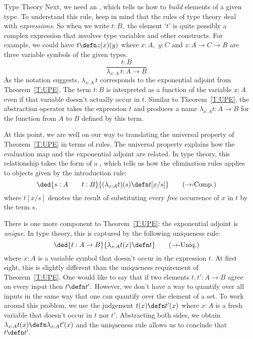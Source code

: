 \begin{unit}{Type Theory}
Next, we need an , which tells us how to \emph{build} elements of a given type.
To understand this rule, keep in mind that the rules of type theory deal with \emph{expressions}.
So when we write \(t:B,\) the element `\(t\)' is quite possibly a complex expression that involves type variables and other constructs.
For example, we could have \(t \defn z(x)(y)\) where \(x:A,\) \(y:C\) and \(z:A \to C \to B\) are three variable symbols of the given types.
\[\frac{t : B}{\lambda_{x:A}\,t : A \to B} \tag{$\to$-Intro.}\]
As the notation suggests, \(\lambda_{x:A}\,t\) corresponds to the exponential adjoint from Theorem~\ref{T:UPE}.
The term \(t:B\) is interpreted as a function of the variable \(x:A\) even if that variable doesn't actually occur in \(t.\)
Similar to Theorem~\ref{T:UPE}, the abstraction operator takes the expression \(t\) and produces a name \(\lambda_{x:A}t : A \to B\) for the function from \(A\) to \(B\) defined by this term.

At this point, we are well on our way to translating the universal property of Theorem~\ref{T:UPE} in terms of rules.
The universal property explains how the evaluation map and the exponential adjoint are related.
In type theory, this relationship takes the form of a , which tells us how the elimination rules applies to objects given by the introduction rule:
\[\ded{s: A \qquad t : B}{(\lambda_{x:A} t)(s) \defn t[x/s]} \tag{$\to$-Comp.}\]
where \(t[x/s]\) denotes the result of substituting every \emph{free} occurrence of \(x\) in \(t\) by the term \(s.\)

There is one more component to Theorem~\ref{T:UPE}: the exponential adjoint is \emph{unique}.
In type theory, this is captured by the following uniqueness rule:
\[\ded{t : A \to B}{\lambda_{x:A} t(x) \defn t} \tag{$\to$-Uniq.}\]
where \(x:A\) is a variable symbol that doesn't occur in the expression \(t.\)
At first sight, this is slightly different than the uniqueness requirement of Theorem~\ref{T:UPE}.
One would like to say that if two elements \(t,t': A \to B\) agree on every input then \(t \defn t'.\)
However, we don't have a way to quantify over all inputs in the same way that one can quantify over the element of a set.
To work around this problem, we use the judgement \(t(x) \defn t'(x)\) where \(x:A\) is a fresh variable that doesn't occur in \(t\) nor \(t'.\)
Abstracting both sides, we obtain \(\lambda_{x:A} t(x) \defn \lambda_{x:A} t'(x)\) and the uniqueness rule allows us to conclude that \(t \defn t'.\)


\end{unit}
